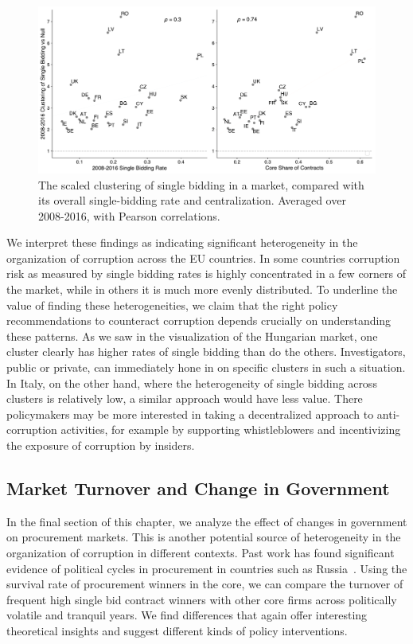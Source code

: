 \begin{figure}
\centering
  \includegraphics[width=\textwidth]{images/ted_networks/sbcluster_comparison.pdf}
  \caption[The scaled clustering of single bidding in a market, compared with its overall single-bidding rate and centralization.]{The scaled clustering of single bidding in a market, compared with its overall single-bidding rate and centralization. Averaged over 2008-2016, with Pearson correlations.}
  \label{fig:sbclustercompare}
\end{figure}


We interpret these findings as indicating significant heterogeneity in the organization of corruption across the EU countries. In some countries corruption risk as measured by single bidding rates is highly concentrated in a few corners of the market, while in others it is much more evenly distributed. To underline the value of finding these heterogeneities, we claim that the right policy recommendations to counteract corruption depends crucially on understanding these patterns. As we saw in the visualization of the Hungarian market, one cluster clearly has higher rates of single bidding than do the others. Investigators, public or private, can immediately hone in on specific clusters in such a situation. In Italy, on the other hand, where the heterogeneity of single bidding across clusters is relatively low, a similar approach would have less value. There policymakers may be more interested in taking a decentralized approach to anti-corruption activities, for example by supporting whistleblowers and incentivizing the exposure of corruption by insiders.    


\subsection{Market Turnover and Change in Government}
In the final section of this chapter, we analyze the effect of changes in government on procurement markets. This is another potential source of heterogeneity in the organization of corruption in different contexts. Past work has found significant evidence of political cycles in procurement in countries such as Russia~\cite{mironov2016corruption}. Using the survival rate of procurement winners in the core, we can compare the turnover of frequent high single bid contract winners with other core firms across politically volatile and tranquil years. We find differences that again offer interesting theoretical insights and suggest different kinds of policy interventions.


